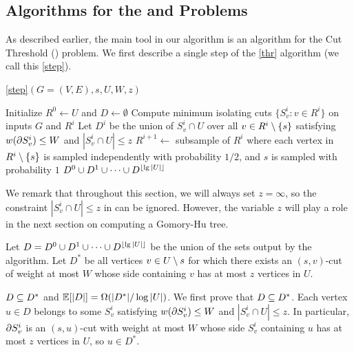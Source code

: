 \subsection{Algorithms for the \ct and \ssc Problems}

As described earlier, the main tool in our \ssc algorithm is an algorithm for the Cut Threshold (\ct) problem. We first describe a single step of the \ref{thr} algorithm (we call this \ref{step}). 


\begin{algorithm}
\caption{\ref{step}$(G=(V,E),s,U,W,z)$} 
\begin{algorithmic}[1]
\State Initialize $R^0\gets U$ and $D\gets\emptyset$
 \State Compute minimum isolating cuts $\{S^i_v:v\in R^i\}$ on inputs $G$ and $R^i$ 
 \State Let $D^i$ be the union of $S^i_v\cap U$ over all $v\in R^i\setminus \{s\}$ satisfying $w(\partial S^i_v)\le W$ and $|S^i_v\cap U|\le z$
 \State $R^{i+1}\gets$ subsample of $R^i$ where each vertex in $R^i\setminus \{s\}$ is sampled independently with probability $1/2$, and $s$ is sampled with probability $1$
\EndFor
\State\Return $D^0\cup D^1\cup \cdots\cup D^{\lfloor\lg|U|\rfloor}$
\end{algorithmic}
\end{algorithm}

We remark that throughout this section, we will always set $z=\infty$, so the constraint $|S^i_v\cap U|\le z$ in  can be ignored. However, the variable $z$ will play a role in the next section on computing a Gomory-Hu tree.

Let $D=D^0\cup D^1\cup \cdots\cup D^{\lfloor\lg|U|\rfloor}$ be the union of the sets output by the algorithm. Let $D^*$ be all vertices $v\in U\setminus s$ for which there exists an $(s,v)$-cut of weight at most $W$ whose side containing $v$ has at most $z$ vertices in $U$.  

\BL{}
$D\subseteq D^*$ and $\mathbb E[|D|] = \Omega(|D^*|/\log|U|)$.
\EL
\BP
We first prove that $D\subseteq D^*$. Each vertex $u\in D$ belongs to some $S^i_v$ satisfying $w(\partial S^i_v)\le W$ and $|S^i_v\cap U|\le z$. %
In particular, $\partial S^i_v$ is an $(s,u)$-cut with weight at most $ W$ whose side $S^i_v$ containing $u$ has at most $z$ vertices in $U$, so $u\in D^*$.

